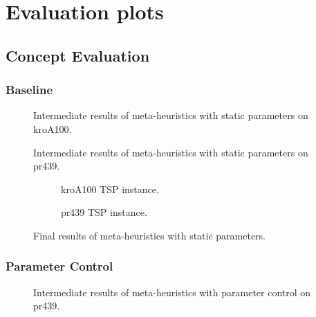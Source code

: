 \chapter{Evaluation plots}
\section{Concept Evaluation}

\subsection{Baseline}\label{app:eval:bl plots}

\begin{figure}[!htbp]
	\centering
	
	\caption{Intermediate results of meta-heuristics with static parameters on kroA100.}
	\label{app:eval:1:bl:kroA100 intermediate}
\end{figure}

\begin{figure}[!htbp]
	\centering
	
	\caption{Intermediate results of meta-heuristics with static parameters on pr439.}
	\label{app:eval:1:bl:pr439 intermediate}
\end{figure}


\begin{figure}[!htbp]
	\centering
	\begin{subfigure}{0.45\textwidth}
		
		\caption{kroA100 TSP instance.}
		\label{app:eval:1:bl:kroA100 final}
	\end{subfigure}
	\begin{subfigure}{0.45\textwidth}
		
		\caption{pr439 TSP instance.}
		\label{app:eval:1:bl:pr439 final}
	\end{subfigure}
	\caption{Final results of meta-heuristics with static parameters.}
	
\end{figure}

\FloatBarrier
\subsection{Parameter Control}\label{app:eval:pc plots}
\begin{figure}[!htbp]
	\centering
	
	\caption{Intermediate results of meta-heuristics with parameter control on pr439.}
	\label{app:eval:1:pc:pr439 intermediate}
\end{figure}

